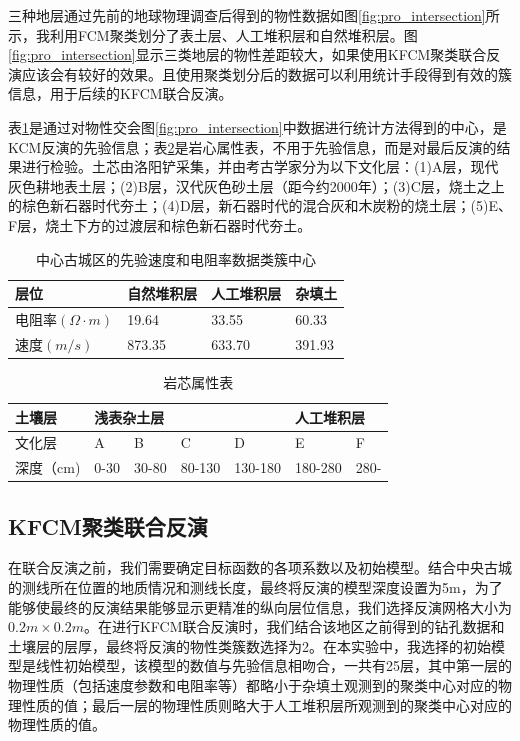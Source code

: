 三种地层通过先前的地球物理调查后得到的物性数据如图\ref{fig:pro_intersection}所示，我利用FCM聚类划分了表土层、人工堆积层和自然堆积层。图\ref{fig:pro_intersection}显示三类地层的物性差距较大，如果使用KFCM聚类联合反演应该会有较好的效果。且使用聚类划分后的数据可以利用统计手段得到有效的簇信息，用于后续的KFCM联合反演。

表\ref{tab:center}是通过对物性交会图\ref{fig:pro_intersection}中数据进行统计方法得到的中心，是KCM反演的先验信息；表\ref{tab:borehole}是岩心属性表，不用于先验信息，而是对最后反演的结果进行检验。土芯由洛阳铲采集，并由考古学家分为以下文化层：(1)A层，现代灰色耕地表土层；(2)B层，汉代灰色砂土层（距今约2000年）；(3)C层，烧土之上的棕色新石器时代夯土；(4)D层，新石器时代的混合灰和木炭粉的烧土层；(5)E、F层，烧土下方的过渡层和棕色新石器时代夯土。

\begin{table}[h]
\centering
\begin{tabular}{|l|l|l|l|}
\hline
层位 & 自然堆积层 & 人工堆积层 & 杂填土 \\ \hline
电阻率$(\Omega \cdot m)$ & 19.64 & 33.55 & 60.33 \\ \hline
速度$(m/s)$ & 873.35 & 633.70 & 391.93 \\ \hline
\end{tabular}
\caption{中心古城区的先验速度和电阻率数据类簇中心}
\label{tab:center}
\end{table}

\begin{table}[h]
\centering
\begin{tabular}{|l|llll|ll|}
\hline
土壤层 & \multicolumn{4}{l|}{浅表杂土层} & \multicolumn{2}{l|}{人工堆积层} \\ \hline
文化层 & \multicolumn{1}{l|}{A} & \multicolumn{1}{l|}{B} & \multicolumn{1}{l|}{C} & D & \multicolumn{1}{l|}{E} & F \\ \hline
深度（cm) & \multicolumn{1}{l|}{0-30} & \multicolumn{1}{l|}{30-80} & \multicolumn{1}{l|}{80-130} & 130-180 & \multicolumn{1}{l|}{180-280} & 280- \\ \hline
\end{tabular}
\caption{岩芯属性表}
\label{tab:borehole}
\end{table}

\subsection{KFCM聚类联合反演}

在联合反演之前，我们需要确定目标函数的各项系数以及初始模型。结合中央古城的测线所在位置的地质情况和测线长度，最终将反演的模型深度设置为5m，为了能够使最终的反演结果能够显示更精准的纵向层位信息，我们选择反演网格大小为$0.2m\times0.2m$。在进行KFCM联合反演时，我们结合该地区之前得到的钻孔数据和土壤层的层厚，最终将反演的物性类簇数选择为2。在本实验中，我选择的初始模型是线性初始模型，该模型的数值与先验信息相吻合，一共有25层，其中第一层的物理性质（包括速度参数和电阻率等）都略小于杂填土观测到的聚类中心对应的物理性质的值；最后一层的物理性质则略大于人工堆积层所观测到的聚类中心对应的物理性质的值。

